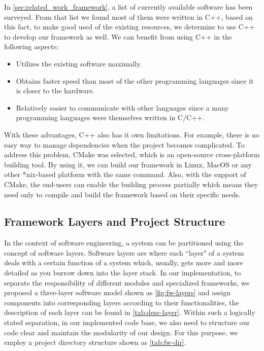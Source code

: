 In \autoref{sec:related_work_framework}, a list of currently available software
has been surveyed. From that list we found most of them were written in C++, based
on this fact, to make good used of the existing resources, we
determine to use C++ to develop our framework as well. We can benefit from using 
C++ in the following aspects:

\begin{itemize}
    \item Utilizes the existing software maximally.
    \item Obtains faster speed than most of the other programming languages 
    since it is closer to the hardware.
    \item Relatively easier to communicate with other languages since a many
    programming languages were themselves written in C/C++.
\end{itemize}

With these advantages, C++ also has it own limitations. For example, there is
no easy way to manage dependencies when the project becomes complicated.
To address this problem, CMake was selected, which is an open-source cross-platform building tool. By using it, we can build our framework in
Linux, MacOS or any other *nix-based platform with the same command.
Also, with the support of CMake, the end-users can enable the building process
partially which means they need only to compile and build the framework based on their
specific needs.

\subsection{Framework Layers and Project Structure}
\label{sec:fw-inst-layer-strcut}

In the context of software engineering, a system can be partitioned using the
concept of software layers. Software layers are where each ``layer" of a system
deals with a certain function of a system which, usually, gets more and more
detailed as you burrow down into the layer stack. In our implementation, to separate the responsibility of different modules and specialized
frameworks, we proposed a three-layer software model shown as
\autoref{fig:fw-layers} and assign components into
corresponding layers according to their functionalities, the description of each
layer can be found in \autoref{tab:desc-layer}. Within such a logically stated separation,
in our implemented code base, we also need to structure our code clear and
maintain the modularity of our design. For this purpose, we employ a project
directory structure shown as \autoref{tab:fw-dir}.

